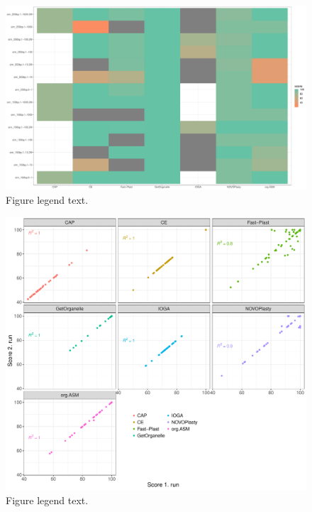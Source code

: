 \documentclass{bmcart}
\begin{document}
\begin{backmatter}
\begin{figure}[h!]
  \includegraphics[width=\textwidth]{plots/sim_tiles.pdf}
  \caption{
      Figure legend text.}
      \end{figure}

\begin{figure}[h!]
  \includegraphics[width=\textwidth]{plots/repro.pdf}
  \caption{
      Figure legend text.}
      \end{figure}


\end{backmatter}
\end{document}
